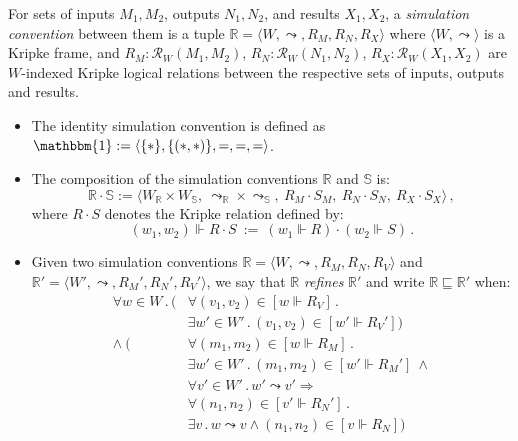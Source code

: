 \documentclass[acmsmall,timestamp,review]{acmart}
\begin{document}
\begin{definition}
For sets of inputs $M_1, M_2$, outputs $N_1, N_2$, and results $X_1, X_2$,
a \emph{simulation convention} between them
is a tuple $\mathbb{R} = \langle W, \leadsto, R_M, R_N, R_X \rangle$
where $\langle W, \leadsto \rangle$ is a Kripke frame, and
$R_M : \mathcal{R}_W(M_1, M_2)$,
$R_N : \mathcal{R}_W(N_1, N_2)$,
$R_X : \mathcal{R}_W(X_1, X_2)$
are $W$-indexed Kripke logical relations
between the respective sets of inputs, outputs and results.
\begin{itemize}
\item
The identity simulation convention is defined as
$\mathbbm{1} := \langle \{*\}, \{(*,*)\}, {=}, {=}, {=} \rangle$.
\item
The composition of
the simulation conventions $\mathbb{R}$ and $\mathbb{S}$ is:
\[
    \mathbb{R} \cdot \mathbb{S} :=
      \langle
        W_\mathbb{R} \times W_\mathbb{S}, \:
        {\leadsto}_\mathbb{R} \times {\leadsto}_\mathbb{S}, \:
        R_M \cdot S_M, \:
        R_N \cdot S_N, \:
        R_X \cdot S_X
      \rangle \,,
\]
where $R \cdot S$ denotes the Kripke relation defined by:
\[
    (w_1, w_2) \Vdash R \cdot S \: := \:
      (w_1 \Vdash R) \cdot (w_2 \Vdash S) \,.
\]
\item
Given two simulation conventions
$\mathbb{R} = \langle W, \leadsto, R_M, R_N, R_V \rangle$ and
$\mathbb{R}' = \langle W', \leadsto, R_M', R_N', R_V' \rangle$,
we say that $\mathbb{R}$ \emph{refines} $\mathbb{R}'$
and write $\mathbb{R} \sqsubseteq \mathbb{R}'$
when:
\begin{align*}
  \forall w \in W \,.\, (
    &\forall (v_1, v_2) \in [w \Vdash R_V] \,.\, \\
    &\exists w' \in W' \,.\, (v_1, v_2) \in [w' \Vdash R_V']) \\
  \wedge \: (
    &\forall (m_1, m_2) \in [w \Vdash R_M] \,.\, \\
    &\exists w' \in W' \,.\, (m_1, m_2) \in [w' \Vdash R_M'] \: \wedge \\
    &\forall v' \in W' \,.\, w' \leadsto v' \Rightarrow \\
    &\forall (n_1, n_2) \in [v' \Vdash R_N'] \,.\, \\
    &\exists v \,.\, w \leadsto v \wedge (n_1, n_2) \in [v \Vdash R_N] )
\end{align*}
\end{itemize}
\end{definition}
\end{document}
